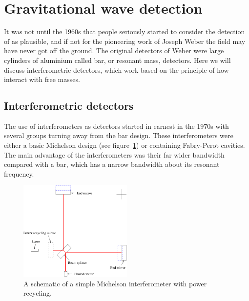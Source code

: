 \section{Gravitational wave detection}
It was not until the 1960s that people seriously started to consider the detection of \gws as
plausible, and if not for the pioneering work of Joseph Weber \cite{Weber:1960} the field may have
never got off the ground. The original detectors of Weber were large cylinders of aluminium called
bar, or resonant mass, detectors. Here we will discuss interferometric detectors, which work based
on the principle of how \gws interact with free masses.

\subsection{Interferometric detectors}
The use of interferometers as \gw detectors started in earnest in the 1970s with several groups
turning away from the bar design. These interferometers were either a basic Michelson design (see
figure~\ref{interferometer}) or containing Fabry-Perot cavities. The main advantage of the
interferometers was their far wider bandwidth compared with a bar, which has a narrow bandwidth
about its resonant frequency.
\begin{figure}[!htbp]
\begin{center}
\includegraphics[width=0.5\textwidth]{figs/interferometer}\caption{ A schematic of a
simple Michelson interferometer with power recycling.}\label{interferometer}
\end{center}
\end{figure}

